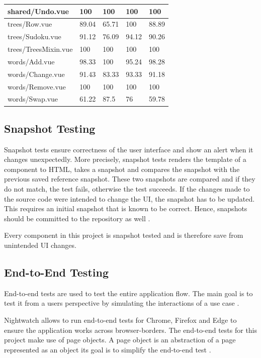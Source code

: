\begin{table}
\begin{adjustwidth}{-2cm}{}
\begin{tabular}{|l|l|l|l|l|}
            shared/Undo.vue & 100 & 100 & 100 & 100 \\ \hline
            trees/Row.vue & 89.04 & 65.71 & 100 & 88.89 \\ \hline
            trees/Sudoku.vue & 91.12 & 76.09 & 94.12 & 90.26 \\ \hline
            trees/TreesMixin.vue & 100 & 100 & 100 & 100 \\ \hline
            words/Add.vue & 98.33 & 100 & 95.24 & 98.28 \\ \hline
            words/Change.vue & 91.43 & 83.33 & 93.33 & 91.18 \\ \hline
            words/Remove.vue & 100 & 100 & 100 & 100 \\ \hline
            words/Swap.vue & 61.22 & 87.5 & 76 & 59.78 \\ \hline
        \end{tabular}
        \label{table:testCoverage}
    \end{adjustwidth}
\end{table}

\subsection{Snapshot Testing}
\label{subsection:snapshotTesting}
Snapshot tests ensure correctness of the user interface and show an alert when it changes unexpectedly. More precisely, snapshot tests renders the template of a component to HTML, takes a snapshot and compares the snapshot with the previous saved reference snapshot. These two snapshots are compared and if they do not match, the test fails, otherwise the test succeeds. If the changes made to the source code were intended to change the UI, the snapshot has to be updated. This requires an initial snapshot that is known to be correct. Hence, snapshots should be committed to the repository as well \cite{Jest}.

Every component in this project is snapshot tested and is therefore save from unintended UI changes.

\subsection{End-to-End Testing}
\label{subsection:e2e}
End-to-end tests are used to test the entire application flow. The main goal is to test it from a users perspective by simulating the interactions of a use case \cite{EndToEndTests}. 

Nightwatch allows to run end-to-end tests for Chrome, Firefox and Edge to ensure the application works across browser-borders. The end-to-end tests for this project make use of page objects. A page object is an abstraction of a page represented as an object its goal is to simplify the end-to-end test \cite{Nightwatch}.

